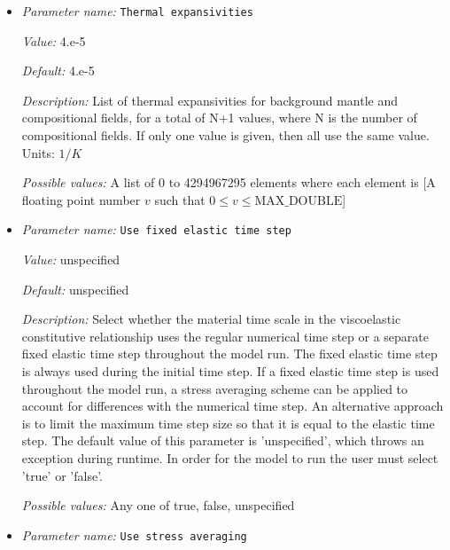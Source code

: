 \begin{itemize}
{\it Possible values:} A list of 0 to 4294967295 elements where each element is [A floating point number $v$ such that $0 \leq v \leq \text{MAX\_DOUBLE}$]
\item {\it Parameter name:} {\tt Thermal expansivities}
\label{parameters:Material model/Viscoelastic/Thermal expansivities}
\label{parameters:Material_20model/Viscoelastic/Thermal_20expansivities}


{\it Value:} 4.e-5


{\it Default:} 4.e-5


{\it Description:} List of thermal expansivities for background mantle and compositional fields, for a total of N+1 values, where N is the number of compositional fields. If only one value is given, then all use the same value. Units: $1/K$


{\it Possible values:} A list of 0 to 4294967295 elements where each element is [A floating point number $v$ such that $0 \leq v \leq \text{MAX\_DOUBLE}$]
\item {\it Parameter name:} {\tt Use fixed elastic time step}
\label{parameters:Material model/Viscoelastic/Use fixed elastic time step}
\label{parameters:Material_20model/Viscoelastic/Use_20fixed_20elastic_20time_20step}


{\it Value:} unspecified


{\it Default:} unspecified


{\it Description:} Select whether the material time scale in the viscoelastic constitutive relationship uses the regular numerical time step or a separate fixed elastic time step throughout the model run. The fixed elastic time step is always used during the initial time step. If a fixed elastic time step is used throughout the model run, a stress averaging scheme can be applied to account for differences with the numerical time step. An alternative approach is to limit the maximum time step size so that it is equal to the elastic time step. The default value of this parameter is 'unspecified', which throws an exception during runtime. In order for the model to run the user must select 'true' or 'false'.


{\it Possible values:} Any one of true, false, unspecified
\item {\it Parameter name:} {\tt Use stress averaging}
\label{parameters:Material model/Viscoelastic/Use stress averaging}
\label{parameters:Material_20model/Viscoelastic/Use_20stress_20averaging}



\end{itemize}

